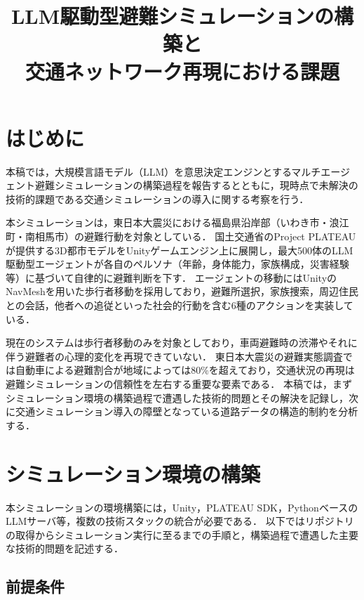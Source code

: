 \documentclass[a4paper,11pt]{jsarticle}
\title{LLM駆動型避難シミュレーションの構築と\\交通ネットワーク再現における課題}
\author{}
\date{}
\begin{document}
\maketitle

\section{はじめに}

本稿では，大規模言語モデル（LLM）を意思決定エンジンとするマルチエージェント避難シミュレーションの構築過程を報告するとともに，現時点で未解決の技術的課題である交通シミュレーションの導入に関する考察を行う．

本シミュレーションは，東日本大震災における福島県沿岸部（いわき市・浪江町・南相馬市）の避難行動を対象としている．
国土交通省のProject PLATEAUが提供する3D都市モデルをUnityゲームエンジン上に展開し，最大500体のLLM駆動型エージェントが各自のペルソナ（年齢，身体能力，家族構成，災害経験等）に基づいて自律的に避難判断を下す．
エージェントの移動にはUnityのNavMeshを用いた歩行者移動を採用しており，避難所選択，家族捜索，周辺住民との会話，他者への追従といった社会的行動を含む6種のアクションを実装している．

現在のシステムは歩行者移動のみを対象としており，車両避難時の渋滞やそれに伴う避難者の心理的変化を再現できていない．
東日本大震災の避難実態調査では自動車による避難割合が地域によっては80\%を超えており\cite{evacuationsurvey}，交通状況の再現は避難シミュレーションの信頼性を左右する重要な要素である．
本稿では，まずシミュレーション環境の構築過程で遭遇した技術的問題とその解決を記録し，次に交通シミュレーション導入の障壁となっている道路データの構造的制約を分析する．

\section{シミュレーション環境の構築}

本シミュレーションの環境構築には，Unity，PLATEAU SDK，Pythonベースの LLMサーバ等，複数の技術スタックの統合が必要である．
以下ではリポジトリの取得からシミュレーション実行に至るまでの手順と，構築過程で遭遇した主要な技術的問題を記述する．

\subsection{前提条件}
\end{document}
